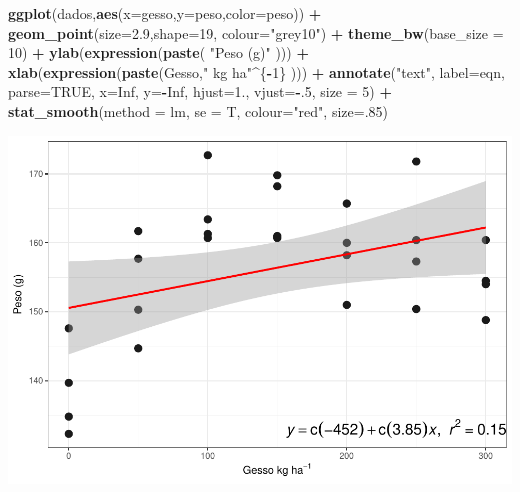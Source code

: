 \documentclass[]{book}
\newenvironment{Shaded}{\begin{snugshade}}{\end{snugshade}}
\newcommand{\DataTypeTok}[1]{\textcolor[rgb]{0.13,0.29,0.53}{#1}}
\newcommand{\DecValTok}[1]{\textcolor[rgb]{0.00,0.00,0.81}{#1}}
\newcommand{\FloatTok}[1]{\textcolor[rgb]{0.00,0.00,0.81}{#1}}
\newcommand{\KeywordTok}[1]{\textcolor[rgb]{0.13,0.29,0.53}{\textbf{#1}}}
\newcommand{\NormalTok}[1]{#1}
\newcommand{\OperatorTok}[1]{\textcolor[rgb]{0.81,0.36,0.00}{\textbf{#1}}}
\newcommand{\OtherTok}[1]{\textcolor[rgb]{0.56,0.35,0.01}{#1}}
\newcommand{\StringTok}[1]{\textcolor[rgb]{0.31,0.60,0.02}{#1}}
\begin{document}
\begin{Shaded}
\begin{Highlighting}[]
\KeywordTok{ggplot}\NormalTok{(dados,}\KeywordTok{aes}\NormalTok{(}\DataTypeTok{x=}\NormalTok{gesso,}\DataTypeTok{y=}\NormalTok{peso,}\DataTypeTok{color=}\NormalTok{peso))  }\OperatorTok{+}\StringTok{ }
\StringTok{  }\KeywordTok{geom_point}\NormalTok{(}\DataTypeTok{size=}\FloatTok{2.9}\NormalTok{,}\DataTypeTok{shape=}\DecValTok{19}\NormalTok{, }\DataTypeTok{colour=}\StringTok{"grey10"}\NormalTok{) }\OperatorTok{+}\StringTok{ }
\StringTok{    }\KeywordTok{theme_bw}\NormalTok{(}\DataTypeTok{base_size =} \DecValTok{10}\NormalTok{) }\OperatorTok{+}\StringTok{ }
\StringTok{        }\KeywordTok{ylab}\NormalTok{(}\KeywordTok{expression}\NormalTok{(}\KeywordTok{paste}\NormalTok{(  }\StringTok{"Peso (g)"}\NormalTok{ )))  }\OperatorTok{+}\StringTok{ }
\StringTok{        }\KeywordTok{xlab}\NormalTok{(}\KeywordTok{expression}\NormalTok{(}\KeywordTok{paste}\NormalTok{(Gesso,}\StringTok{" kg ha"}\OperatorTok{^}\NormalTok{\{}\OperatorTok{-}\DecValTok{1}\NormalTok{\} )))  }\OperatorTok{+}\StringTok{ }
\StringTok{        }\KeywordTok{annotate}\NormalTok{(}\StringTok{"text"}\NormalTok{, }\DataTypeTok{label=}\NormalTok{eqn, }\DataTypeTok{parse=}\OtherTok{TRUE}\NormalTok{, }\DataTypeTok{x=}\OtherTok{Inf}\NormalTok{, }\DataTypeTok{y=}\OperatorTok{-}\OtherTok{Inf}\NormalTok{,}
             \DataTypeTok{hjust=}\FloatTok{1.}\NormalTok{, }\DataTypeTok{vjust=}\OperatorTok{-}\NormalTok{.}\DecValTok{5}\NormalTok{, }\DataTypeTok{size =} \DecValTok{5}\NormalTok{)  }\OperatorTok{+}\StringTok{    }
\StringTok{        }\KeywordTok{stat_smooth}\NormalTok{(}\DataTypeTok{method =}\NormalTok{ lm, }\DataTypeTok{se =}\NormalTok{ T, }\DataTypeTok{colour=}\StringTok{"red"}\NormalTok{, }\DataTypeTok{size=}\NormalTok{.}\DecValTok{85}\NormalTok{)}
\end{Highlighting}
\end{Shaded}

\includegraphics{TudodoR_files/figure-latex/unnamed-chunk-226-1.pdf}
\end{document}
